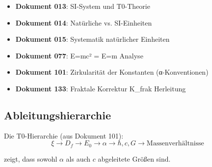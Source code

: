 	\begin{itemize}
		\item \textbf{Dokument 013}: SI-System und T0-Theorie \\

		\item \textbf{Dokument 014}: Natürliche vs. SI-Einheiten \\

		\item \textbf{Dokument 015}: Systematik natürlicher Einheiten \\

		\item \textbf{Dokument 077}: E=mc² = E=m Analyse \\

		\item \textbf{Dokument 101}: Zirkularität der Konstanten (α-Konventionen) \\

		\item \textbf{Dokument 133}: Fraktale Korrektur K\_frak Herleitung \\
		
	\end{itemize}
	
	\subsection{Ableitungshierarchie}
	
	Die T0-Hierarchie (aus Dokument 101):
	\begin{equation}
		\xi \to D_f \to E_0 \to \alpha \to \hbar, c, G \to \text{Massenverhältnisse}
	\end{equation}
	
	zeigt, dass sowohl $\alpha$ als auch $c$ abgeleitete Größen sind.
